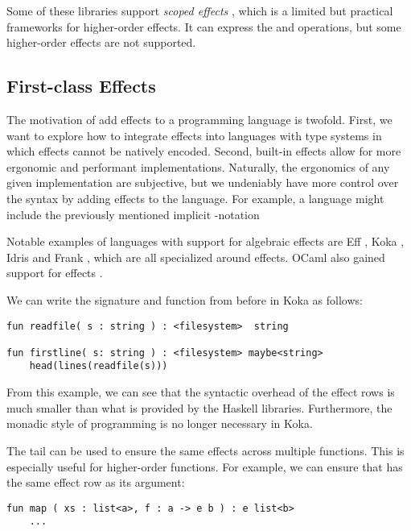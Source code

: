 Some of these libraries support \emph{scoped effects} \autocite{wu_effect_2014}, which is a limited but practical frameworks for higher-order effects. It can express the \olocal and \ocatch operations, but some higher-order effects are not supported.

\subsection{First-class Effects}

The motivation of add effects to a programming language is twofold. First, we want to explore how to integrate effects into languages with type systems in which effects cannot be natively encoded. Second, built-in effects allow for more ergonomic and performant implementations. Naturally, the ergonomics of any given implementation are subjective, but we undeniably have more control over the syntax by adding effects to the language. For example, a language might include the previously mentioned implicit -notation

Notable examples of languages with support for algebraic effects are Eff \autocite{bauer_programming_2015}, Koka \autocite{leijen_koka_2014}, Idris \autocite{brady_programming_2013} and Frank \autocite{lindley_be_2017}, which are all specialized around effects. OCaml also gained support for effects \autocite{sivaramakrishnan_retrofitting_2021}.

We can write the  signature and  function from before in Koka as follows:
\begin{lstlisting}[language={},style=fancy]
fun readfile( s : string ) : <filesystem>  string

fun firstline( s: string ) : <filesystem> maybe<string>
    head(lines(readfile(s)))
\end{lstlisting}
From this example, we can see that the syntactic overhead of the effect rows is much smaller than what is provided by the Haskell libraries. Furthermore, the monadic style of programming is no longer necessary in Koka.

The tail can be used to ensure the same effects across multiple functions. This is especially useful for higher-order functions. For example, we can ensure that  has the same effect row as its argument:
\begin{lstlisting}[language={},style=fancy]
fun map ( xs : list<a>, f : a -> e b ) : e list<b>
    ...
\end{lstlisting}

